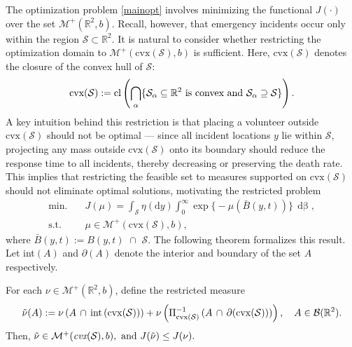 \documentclass[stsy,sglanonrev]{informs4}
\newcommand{\death}{{\beta}}
\begin{document}
The optimization problem \eqref{mainopt} involves minimizing the functional $J(\cdot)$ over the set $\mathcal{M}^+(\mathbb{R}^2,b)$. Recall, however, that emergency incidents occur only within the region \( \mathcal{S} \subset \mathbb{R}^2 \). It is natural to consider whether restricting the optimization domain to \( \mathcal{M}^+(\mbox{cvx}(\mathcal{S}),b) \) is sufficient. Here, \( \mbox{cvx}(\mathcal{S}) \) denotes the closure of the convex hull of \( \mathcal{S} \): $$\mbox{cvx}(\mathcal{S}) := {\rm{cl}}\left(\bigcap_{\alpha}\{\mathcal{S}_{\alpha} \subseteq \mathbb{R}^2 \mbox{ is convex  and } \mathcal{S}_{\alpha} \supseteq \mathcal{S}\}\right).$$ A key intuition behind this restriction is that placing a volunteer outside $\mbox{cvx}(\mathcal{S})$ should not be optimal --- since all incident locations \( y \) lie within \( \mathcal{S} \), projecting any mass outside \( \mbox{cvx}(\mathcal{S}) \) onto its boundary should reduce the response time to all incidents, thereby decreasing or preserving the death rate. This implies that restricting the feasible set to measures supported on \( \mbox{cvx}(\mathcal{S}) \) should not eliminate optimal solutions, motivating the restricted problem
\begin{align}\label{restrictedopt} \mbox{min.} & \quad J(\mu) = \int_{\mathcal{S}} \eta(\mbox{d}y) \int_0^\infty \exp\Big\{-\mu(\bar{B}(y,t))\Big\} \, \mathop{d\death(t)}, \nonumber \\ \mbox{s.t.} & \quad \mu \in \mathcal{M}^+(\mbox{cvx}(\mathcal{S}),b), \tag{$P$}\end{align} where $\bar{B}(y,t):= B(y,t) \,\, \cap \,\, \mathcal{S}.$ The following theorem formalizes this result. Let int$(A)$ and $\partial(A)$ denote the interior and boundary of the set $A$ respectively.

\begin{theorem}\label{thm:restrict} For each $\nu \in \mathcal{M}^+(\mathbb{R}^2,b)$, define the restricted measure \begin{align*}\label{pushforward}  \tilde{\nu}(A) := \nu\left(A \, \cap \, \rm{int}\left(\rm{cvx}(\mathcal{S})\right)\right) +  \nu\left(\Pi^{-1}_{\rm{cvx}(\mathcal{S})}\left(A \, \cap \, \partial(\rm{cvx}(\mathcal{S}))\right)\right), \quad A \in \mathcal{B}(\mathbb{R}^2). \end{align*} Then, $\tilde{\nu} \in \mathcal{M}^+(\emph{\mbox{cvx}}(\mathcal{S}),b),\mbox{ and } J(\tilde{\nu}) \leq J(\nu).$\end{theorem} 
\end{document}
